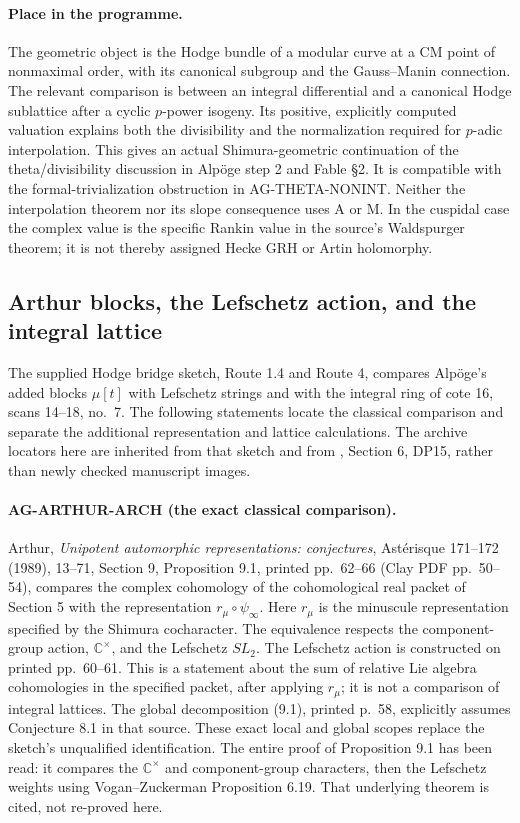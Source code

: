 \documentclass[11pt,a4paper]{article}
\begin{document}
\paragraph{Place in the programme.}
The geometric object is the Hodge bundle of a modular curve at a CM
point of nonmaximal order, with its canonical subgroup and the
Gauss--Manin connection.  The relevant comparison is between an
integral differential and a canonical Hodge sublattice after a cyclic
$p$-power isogeny.  Its positive, explicitly computed valuation
explains both the divisibility and the normalization required for
$p$-adic interpolation.  This gives an actual Shimura-geometric
continuation of the theta/divisibility discussion in Alpöge step 2
and Fable \S2.  It is compatible with the formal-trivialization
obstruction in AG-THETA-NONINT.  Neither the interpolation theorem
nor its slope consequence uses A or M.  In the cuspidal case the
complex value is the specific Rankin value in the source's
Waldspurger theorem; it is not thereby assigned Hecke GRH or
Artin holomorphy.

\subsection{Arthur blocks, the Lefschetz action, and the integral lattice}
\label{ag:arthur}

The supplied Hodge bridge sketch, Route 1.4 and Route 4, compares
Alpöge's added blocks $\mu[t]$ with Lefschetz strings and with the
integral ring of cote 16, scans 14--18, no.~7. The following
statements locate the classical comparison and separate the
additional representation and lattice calculations. The archive
locators here are inherited from that sketch and from
, Section 6,
DP15, rather than newly checked manuscript images.

\paragraph{AG-ARTHUR-ARCH (the exact classical comparison).}
Arthur, \emph{Unipotent automorphic representations: conjectures},
Astérisque 171--172 (1989), 13--71, Section 9,
Proposition 9.1, printed pp.~62--66 (Clay PDF pp.~50--54),
compares the complex cohomology of the cohomological real packet
of Section 5 with the representation $r_\mu\circ\psi_\infty$.
Here $r_\mu$ is the minuscule representation specified by the
Shimura cocharacter. The equivalence respects the component-group
action, $\mathbb C^\times$, and the Lefschetz $SL_2$.
The Lefschetz action is constructed on printed pp.~60--61.
This is a statement about the sum of relative Lie algebra
cohomologies in the specified packet, after applying $r_\mu$;
it is not a comparison of integral lattices. The global
decomposition (9.1), printed p.~58, explicitly assumes
Conjecture 8.1 in that source. These exact local and global
scopes replace the sketch's unqualified identification.
The entire proof of Proposition 9.1 has been read: it compares
the $\mathbb C^\times$ and component-group characters, then the
Lefschetz weights using Vogan--Zuckerman Proposition 6.19.
That underlying theorem is cited, not re-proved here.
\end{document}
